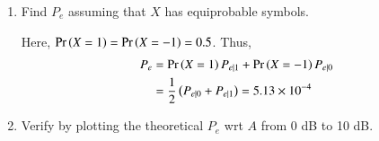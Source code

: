 \documentclass[journal,12pt,twocolumn]{IEEEtran}
\renewcommand\thesection{\arabic{section}}
\begin{document}
\begin{enumerate}[label=\thesection.\arabic*
,ref=\thesection.\theenumi]
Letting $X = 1$ and $X = -1$ respectively, we see the number of mismatched data points to compute the error probabilities. The simulation is coded in
\begin{lstlisting}
$ wget https://github.com/Anshul-Sangrame/AI1110/blob/main/Assignment/solution/5/5.5.py
\end{lstlisting}
and can be run by typing
\begin{lstlisting}
$ python3 5.5.py
\end{lstlisting}
The results are
		\begin{align}
			P_{e|0} = 5.02 \times 10^{-4} \\
			P_{e|1} = 5.24 \times 10^{-4}
		\end{align}
%
\item Find $P_e$ assuming that $X$ has equiprobable symbols.

\solution

Here, $\Pr\left(X = 1\right) = \Pr\left(X = -1\right) = 0.5$. Thus,
	\begin{align}
		P_e &= \Pr\left(X = 1\right)P_{e|1} + \Pr\left(X = -1\right)P_{e|0} \label{eq:pe-gen} \\
		&= \frac{1}{2}\left(P_{e|0} + P_{e|1}\right) = 5.13 \times 10^{-4}
	\end{align}
%
\item Verify by plotting the theoretical $P_e$ wrt $A$ from 0 dB to 10 dB.

\solution


\end{enumerate}
\end{document}
